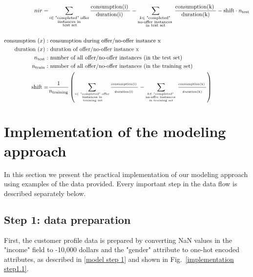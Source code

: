 \documentclass[11pt]{article} %
\begin{document}
\begin{align}
nir=& \sum_{\substack{i \in \text{ "completed" offer}\\ \text{instances in}\\ \text{ test set}}} \frac{ \text{consumption(i) }}{ \text{duration(i) }} -   \sum_{\substack{k \in \text{ "completed" } \\ \text{no-offer instances  }\\ \text{in test set}}} \frac{  \text{consumption(k) }}{ \text{ duration(k) }}-\text{shift}\cdot  n_{\text{test}}
\\
\nonumber\\
 \text{consumption }(x):& \text{\ consumption during offer/no-offer instance x}\nonumber\\ 
 \text{duration }(x):& \text{\ duration of offer/no-offer instance x}\nonumber\\ 
 n_{\text{test}}:& \text{\ number of all offer/no-offer instances (in the test set)}\nonumber\\ 
 n_{\text{train}}:& \text{\ number of all offer/no-offer instances (in the training set)}\nonumber\\ 
 \text{shift}=& {\tiny   \frac{1}{ n_{\text{training}}}   \left(
 \sum_{\substack{i \in \text{ "completed" offer}\\ \text{instances in}\\ \text{ training set}}} \frac{ \text{consumption(i) }}{ \text{duration(i) }} -   \sum_{\substack{k \in \text{ "completed" } \\ \text{no-offer instances  }\\ \text{in training set}}} \frac{  \text{consumption(k) }}{ \text{ duration(k) }}  \right)    }\nonumber
\end{align}

\section{Implementation of the modeling approach}
In this section we present the practical implementation of our modeling approach using examples of the data provided.
Every important step in the data flow is described separately below.

\subsection{Step 1: data preparation}



First, the customer profile data is prepared by converting NaN values in the "income" field to -10,000 dollars and the "gender" attribute to one-hot encoded attributes, as described in \ref{model step 1} and shown in Fig.~\ref{implementation step1.1}.
\end{document}
